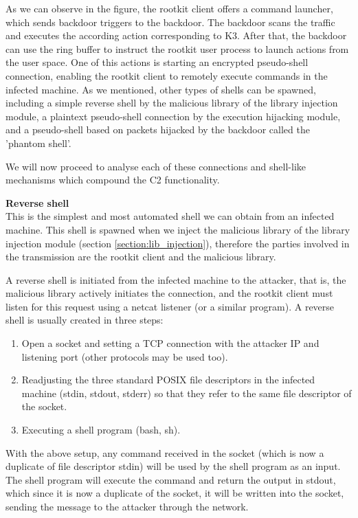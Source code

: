 As we can observe in the figure, the rootkit client offers a command launcher, which sends backdoor triggers to the backdoor. The backdoor scans the traffic and executes the according action corresponding to K3. After that, the backdoor can use the ring buffer to instruct the rootkit user process to launch actions from the user space. One of this actions is starting an encrypted pseudo-shell connection, enabling the rootkit client to remotely execute commands in the infected machine. As we mentioned, other types of shells can be spawned, including a simple reverse shell by the malicious library of the library injection module, a plaintext pseudo-shell connection by the execution hijacking module, and a pseudo-shell based on packets hijacked by the backdoor called the 'phantom shell'. 

We will now proceed to analyse each of these connections and shell-like mechanisms which compound the C2 functionality.


\textbf{Reverse shell}\\
This is the simplest and most automated shell we can obtain from an infected machine. This shell is spawned when we inject the malicious library of the library injection module (section \ref{section:lib_injection}), therefore the parties involved in the transmission are the rootkit client and the malicious library.

A reverse shell is initiated from the infected machine to the attacker, that is, the malicious library actively initiates the connection, and the rootkit client must listen for this request using a netcat listener (or a similar program). A reverse shell is usually created in three steps:
\begin{enumerate}
\item Open a socket and setting a TCP connection with the attacker IP and listening port (other protocols may be used too).
\item Readjusting the three standard POSIX file descriptors in the infected machine (stdin, stdout, stderr) \cite{file_descriptors} so that they refer to the same file descriptor of the socket.
\item Executing a shell program (bash, sh).
\end{enumerate}

With the above setup, any command received in the socket (which is now a duplicate of file descriptor stdin) will be used by the shell program as an input. The shell program will execute the command and return the output in stdout, which since it is now a duplicate of the socket, it will be written into the socket, sending the message to the attacker through the network.

